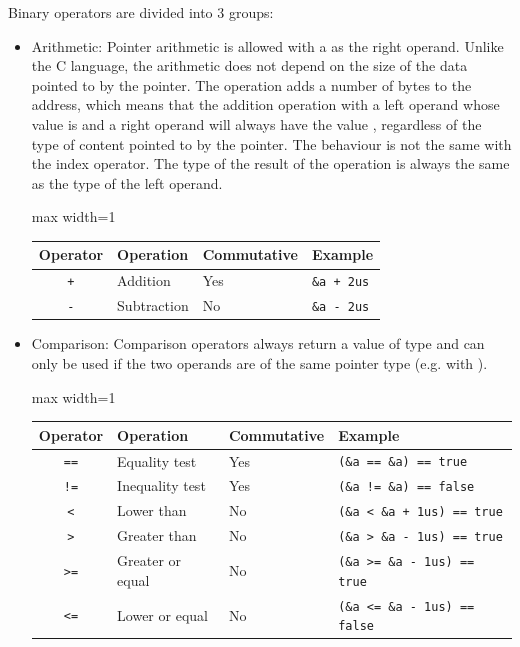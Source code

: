 Binary operators are divided into 3 groups:
\begin{itemize}
  \setlength\itemsep{-4pt}
\item Arithmetic: Pointer arithmetic is allowed with a  as the
  right operand. Unlike the C language, the arithmetic does not depend on the
  size of the data pointed to by the pointer. The operation adds a number of
  bytes to the address, which means that the addition operation with a left
  operand whose value is  and a right operand  will
  always have the value , regardless of the type of content
  pointed to by the pointer. The behaviour is not the same with the index
  operator. The type of the result of the operation is always the same as the
  type of the left operand.

  \begin{center}\begin{adjustbox}{max width=1\linewidth}
    \begin{tabular}{|c|lll|}
      \hline
      Operator & Operation & Commutative & Example \\
      \hline
      \hline
      \texttt{+} & Addition & Yes & \texttt{\&a + 2us} \\
      \texttt{-} & Subtraction & No & \texttt{\&a - 2us} \\
      \hline
    \end{tabular}
  \end{adjustbox}\end{center}

\item Comparison: Comparison operators always return a value of type 
  and can only be used if the two operands are of the same pointer type (e.g.
   with ).

  \begin{center}\begin{adjustbox}{max width=1\linewidth}
      \begin{threeparttable}
        \begin{tabular}{|c|lll|}
          \hline
          Operator & Operation & Commutative & Example \\
          \hline
          \hline
          \texttt{==} & Equality test & Yes & \texttt{(\&a == \&a) == true}\\
          \texttt{!=} & Inequality test & Yes & \texttt{(\&a != \&a) == false}\\
          \texttt{<} & Lower than & No & \texttt{(\&a < \&a + 1us) == true}\\
          \texttt{>} & Greater than & No & \texttt{(\&a > \&a - 1us) == true}\\
          \texttt{>=} & Greater or equal & No & \texttt{(\&a >= \&a - 1us) == true}\\
          \texttt{<=} & Lower or equal & No & \texttt{(\&a <= \&a - 1us) == false}\\
          \hline
        \end{tabular}
    \end{threeparttable}
    \end{adjustbox}\end{center}


\end{itemize}
